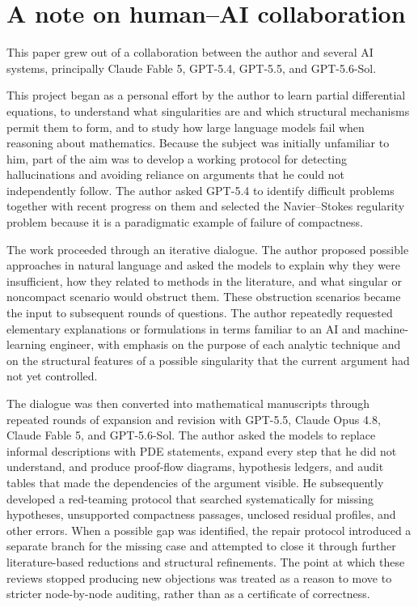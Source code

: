 \documentclass[11pt]{amsart}
\numberwithin{equation}{section}
\theoremstyle{plain}
\theoremstyle{definition}
\theoremstyle{remark}
\begin{document}
\section*{A note on human--AI collaboration}

This paper grew out of a collaboration between the author and several AI
systems, principally Claude Fable 5, GPT-5.4, GPT-5.5, and GPT-5.6-Sol.

This project began as a personal effort by the author to learn partial
differential equations, to understand what singularities are and which
structural mechanisms permit them to form, and to study how large language
models fail when reasoning about mathematics.  Because the subject was
initially unfamiliar to him, part of the aim was to develop a working protocol
for detecting hallucinations and avoiding reliance on arguments that he could
not independently follow.  The author asked GPT-5.4 to identify difficult
problems together with recent progress on them and selected the Navier--Stokes
regularity problem because it is a paradigmatic example of failure of
compactness.

The work proceeded through an iterative dialogue.  The author proposed
possible approaches in natural language and asked the models to explain why
they were insufficient, how they related to methods in the literature, and
what singular or noncompact scenario would obstruct them.  These obstruction
scenarios became the input to subsequent rounds of questions.  The author
repeatedly requested elementary explanations or formulations in terms familiar
to an AI and machine-learning engineer, with emphasis on the purpose of each
analytic technique and on the structural features of a possible singularity
that the current argument had not yet controlled.

The dialogue was then converted into mathematical manuscripts through repeated
rounds of expansion and revision with GPT-5.5, Claude Opus 4.8, Claude Fable 5,
and GPT-5.6-Sol.  The author asked the models to replace informal descriptions
with PDE statements, expand every step that he did not understand, and produce
proof-flow diagrams, hypothesis ledgers, and audit tables that made the
dependencies of the argument visible.  He subsequently developed a
red-teaming protocol that searched systematically for missing hypotheses,
unsupported compactness passages, unclosed residual profiles, and other errors.
When a possible gap was identified, the repair protocol introduced a separate
branch for the missing case and attempted to close it through further
literature-based reductions and structural refinements.  The point at which
these reviews stopped producing new objections was treated as a reason to move
to stricter node-by-node auditing, rather than as a certificate of correctness.
\end{document}
